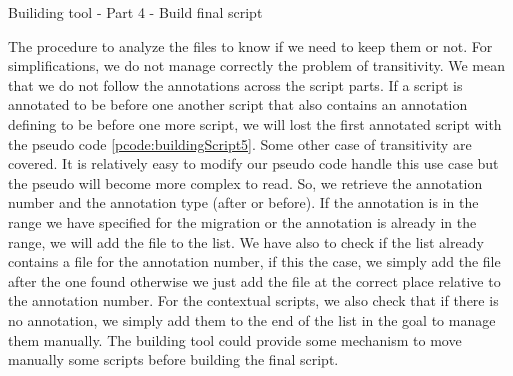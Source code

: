 \begin{algorithm}[h]
	\caption{Builiding tool - Part 4 - Build final script}
	\label{pcode:buildingScript4}
	\begin{algorithmic}
		\State {}
		\State
		\State {}
		\State {}
		\State
		\State {}
			\State {}
			\State {}
			\State {}
			\State {}
			\State {}
		\EndFor
		\State
		\State {}
	\end{algorithmic}
\end{algorithm}



The procedure to analyze the files to know if we need to keep them or not. For simplifications, we do not manage correctly the problem of transitivity. We mean that we do not follow the annotations across the script parts. If a script is annotated to be before one another script that also contains an annotation defining to be before one more script, we will lost the first annotated script with the pseudo code \ref{pcode:buildingScript5}. Some other case of transitivity are covered. It is relatively easy to modify our pseudo code handle this use case but the pseudo will become more complex to read. So, we retrieve the annotation number and the annotation type (after or before). If the annotation is in the range we have specified for the migration or the annotation is already in the range, we will add the file to the list. We have also to check if the list already contains a file for the annotation number, if this the case, we simply add the file after the one found otherwise we just add the file at the correct place relative to the annotation number. For the contextual scripts, we also check that if there is no annotation, we simply add them to the end of the list in the goal to manage them manually. The building tool could provide some mechanism to move manually some scripts before building the final script.

